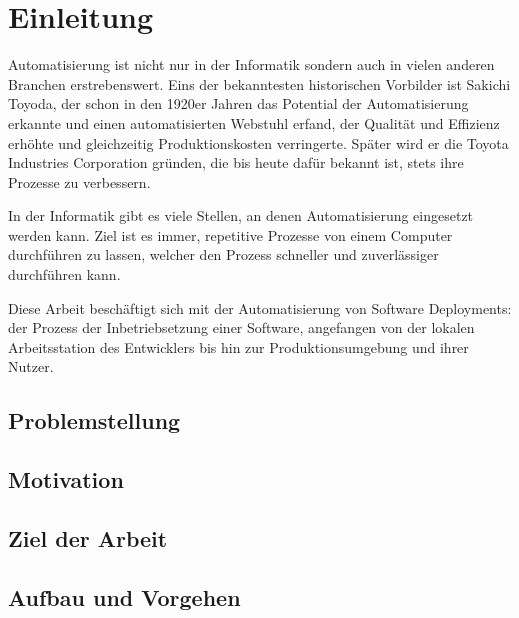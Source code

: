 
\chapter{Einleitung}

Automatisierung ist nicht nur in der Informatik sondern auch in vielen anderen Branchen erstrebenswert. Eins der bekanntesten historischen Vorbilder ist Sakichi Toyoda, der schon in den 1920er Jahren das Potential der Automatisierung erkannte und einen automatisierten Webstuhl erfand, der Qualität und Effizienz erhöhte und gleichzeitig Produktionskosten verringerte. Später wird er die Toyota Industries Corporation gründen, die bis heute dafür bekannt ist, stets ihre Prozesse zu verbessern.

In der Informatik gibt es viele Stellen, an denen Automatisierung eingesetzt werden kann. Ziel ist es immer, repetitive Prozesse von einem Computer durchführen zu lassen, welcher den Prozess schneller und zuverlässiger durchführen kann.

Diese Arbeit beschäftigt sich mit der Automatisierung von Software Deployments: der Prozess der Inbetriebsetzung einer Software, angefangen von der lokalen Arbeitsstation des Entwicklers bis hin zur Produktionsumgebung und ihrer Nutzer.


\section{Problemstellung}


\section{Motivation}


\section{Ziel der Arbeit}


\section{Aufbau und Vorgehen}
